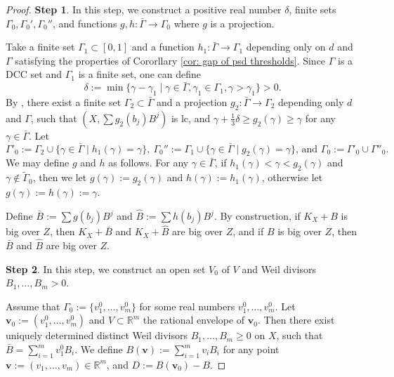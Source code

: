 \documentclass[11pt]{amsart}
\numberwithin{equation}{section}
\newcommand{\Rr}{\mathbb{R}}
\newcommand{\Ii}{{\Gamma}}
\theoremstyle{definition}
\theoremstyle{definition}
\begin{document}
\begin{proof}

\noindent\textbf{Step 1}. In this step, we construct a positive real number $\delta$, finite sets $\Ii_0,\Ii_0',\Ii_0''$, and functions $g,h:\bar\Ii\rightarrow\Ii_0$ where $g$ is a projection.

Take a finite set $\Ii_1\subset [0,1]$ and a function $h_1:\bar\Ii\rightarrow\Ii_1$ depending only on $d$ and $\Ii$ satisfying the properties of Cororllary \ref{cor: gap of psd thresholds}. Since $\Ii$ is a DCC set and $\Ii_1$ is a finite set, one can define
$$\delta:=\min\{\gamma-\gamma_1\mid \gamma\in\bar\Ii,\gamma_1\in\Ii_1,\gamma>\gamma_1\}>0.$$
By \cite[Theorem 5.18]{HLS19}, there exist a finite set $\Ii_2\subset\bar\Ii$ and a projection $g_2: \bar\Ii\rightarrow\Ii_2$ depending only $d$ and $\Ii$, such that $(X,\sum g_2(b_j)B^j)$ is lc, and $\gamma+\frac{1}{3}\delta\geq g_2(\gamma)\geq\gamma$ for any $\gamma\in\bar\Ii$. Let
$$\Ii'_0:=\Ii_2\cup\{\gamma\in\bar\Ii\mid h_1(\gamma)=\gamma\},\ \Ii_0'':=\Ii_1\cup\{\gamma\in\bar\Ii\mid g_2(\gamma)=\gamma\}\text{, and } \Ii_0:=\Ii'_0\cup\Ii''_0.$$
We may define $g$ and $h$ as follows. For any $\gamma\in\bar\Ii$, if $h_1(\gamma)<\gamma<g_2(\gamma)$ and $\gamma\not\in\tilde\Ii_0$, then we let $g(\gamma):=g_2(\gamma)$ and $h(\gamma):=h_1(\gamma)$, otherwise let $g(\gamma):=h(\gamma):=\gamma$.

Define $\bar B:=\sum g(b_j)B^j$ and $\widehat B:=\sum h(b_j)B^j$. By construction, if $K_X+B$ is big over $Z$, then $K_X+\bar B$ and $K_X+\widehat B$ are big over $Z$, and if $B$ is big over $Z$, then $\bar B$ and $\widehat B$ are big over $Z$.

\medskip

\noindent\textbf{Step 2}. In this step, we construct an open set $V_0$ of $V$ and Weil divisors $B_1,\dots,B_m>0$.

Assume that $\Ii_0:=\{v^0_1,\dots,v^0_m\}$ for some real numbers $v^0_1,\dots,v^0_m$. Let $\bm{v}_0:=(v^0_1,\dots,v^0_m)$ and $V\subset\Rr^m$ the rational envelope of $\bm{v}_0$. Then there exist uniquely determined distinct Weil divisors $B_1,\dots,B_m\geq 0$ on $X$, such that $\bar B=\sum_{i=1}^mv^0_1B_i$. We define $B(\bm{v}):=\sum_{i=1}^mv_iB_i$ for any point $\bm{v}:=(v_1,\dots,v_m)\in\Rr^m$, and $D:=B(\bm{v}_0)-B$.


\end{proof}
\end{document}
